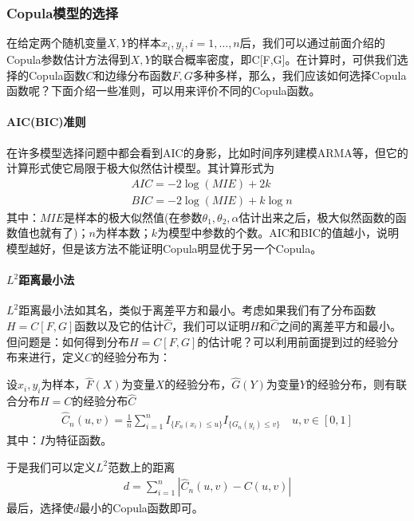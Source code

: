         \subsubsection{Copula模型的选择}
            \par
            在给定两个随机变量$X,Y$的样本$x_i,y_i,i=1,\dots,n$后，我们可以通过前面介绍的Copula参数估计方法得到$X,Y$的联合概率密度，即C[F,G]。在计算时，可供我们选择的Copula函数$C$和边缘分布函数$F,G$多种多样，那么，我们应该如何选择Copula函数呢？下面介绍一些准则，可以用来评价不同的Copula函数。
            \paragraph{AIC(BIC)准则}在许多模型选择问题中都会看到AIC的身影，比如时间序列建模ARMA等，但它的计算形式使它局限于极大似然估计模型。其计算形式为
            \begin{align*}
            &AIC = -2\log (MIE)+2k\\
            &BIC = -2\log(MIE)+ k\log n
            \end{align*}
            其中：$MIE$是样本的极大似然值(在参数$\theta_1,\theta_2,\alpha$估计出来之后，极大似然函数的函数值也就有了)；$n$为样本数；$k$为模型中参数的个数。AIC和BIC的值越小，说明模型越好，但是该方法不能证明Copula明显优于另一个Copula。
            \paragraph{$L^2$距离最小法}$L^2$距离最小法如其名，类似于离差平方和最小。考虑如果我们有了分布函数$H = C[F,G]$函数以及它的估计$\hat{C}$，我们可以证明$H$和$\hat{C}$之间的离差平方和最小。但问题是：如何得到分布$H = C[F,G]$的估计呢？可以利用前面提到过的经验分布来进行，定义$C$的经验分布为：
            \begin{definition}[经验分布]
            设$x_i,y_i$为样本，$\hat{F}(X)$为变量$X$的经验分布，$\hat{G}(Y)$为变量$Y$的经验分布，则有联合分布$H = C$的经验分布$\hat{C}$
            \begin{align*}
            \hat{C}_n(u,v) = \frac{1}{n}\sum_{i=1}^nI_{\{F_n(x_i) \leqslant u \}}I_{\{G_n(y_i) \leqslant v \}} \quad u,v\in [0,1]
            \end{align*}
            其中：$I$为特征函数。
            \end{definition}
            \par
            于是我们可以定义$L^2$范数上的距离
            \begin{align*}
            d = \sum_{i=1}^n \left| \hat{C}_n(u,v) - C(u,v) \right|
            \end{align*}
            最后，选择使$d$最小的Copula函数即可。
